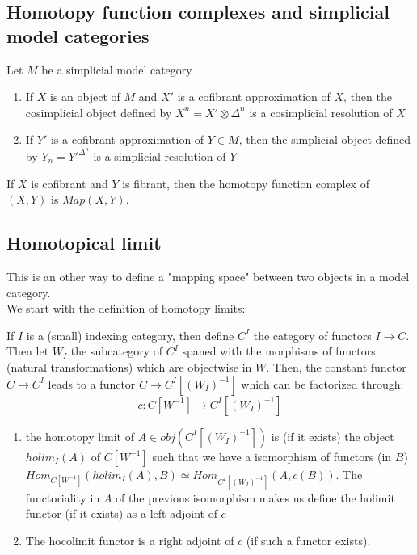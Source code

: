 \begin{refsection}
\subsection{Homotopy function complexes and simplicial model categories}

Let $M$ be a simplicial model category

\begin{prop}
\begin{enumerate}
\item If $X$ is an object of $M$ and $X'$ is a cofibrant approximation of $X$, then the cosimplicial object defined by $X^n = X' \otimes \Delta^n$ is a cosimplicial resolution of $X$
\item If $Y'$ is a cofibrant approximation of $Y \in M$, then the simplicial object defined by $Y_n = Y'^{\Delta^n}$ is a simplicial resolution of $Y$
\end{enumerate}
\end{prop}

\begin{cor}
If $X$ is cofibrant and $Y$ is fibrant, then the homotopy function complex of $(X,Y)$ is $Map(X,Y)$.
\end{cor}

\subsection{Homotopical limit}

This is an other way to define a "mapping space" between two objects in a model category.\\

We start with the definition of homotopy limits:

\begin{defin}
If $I$ is a (small) indexing category, then define $C^I$ the category of functors $I \rightarrow C$. Then let $W_I$ the subcategory of $C^I$ spaned with the morphisms of functors (natural transformations) which are objectwise in $W$. Then, the constant functor $C \rightarrow C^I$ leads to a functor $C \rightarrow C^I[(W_I)^{-1}]$ which can be factorized through:
\begin{equation}
c: C[W^{-1}] \rightarrow C^I[(W_I)^{-1}]
\end{equation}
\begin{enumerate}
\item the homotopy limit of $A \in obj(C^I[(W_I)^{-1}])$ is (if it exists) the object $holim_I(A)$ of $C[W^{-1}]$ such that we have a isomorphism of functors (in $B$) $Hom_{C[W^{-1}]}(holim_I(A),B) \simeq Hom_{C^I[(W_I)^{-1}]}(A, c(B))$. The functoriality in $A$ of the previous isomorphism makes us define the holimit functor (if it exists) as a left adjoint of $c$
\item The hocolimit functor is a right adjoint of $c$ (if such a functor exists).
\end{enumerate}
\end{defin}


\end{refsection}
